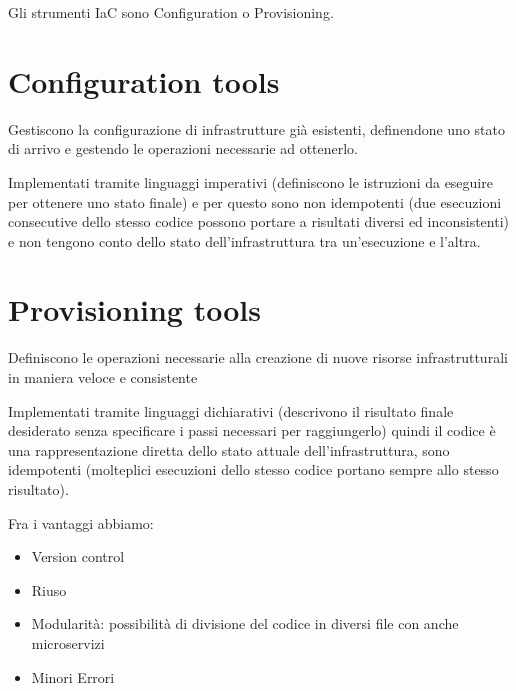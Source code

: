 \documentclass[
]{article}
\providecommand{\tightlist}{%
  \setlength{\itemsep}{0pt}\setlength{\parskip}{0pt}}
\begin{document}
{}

{Gli strumenti IaC sono Configuration o Provisioning.}

{}

\section{\texorpdfstring{{Configuration
tools}}{Configuration tools}}\label{h.kmluy5bzgox}

{Gestiscono la configurazione di infrastrutture già esistenti,
definendone uno stato di arrivo e gestendo le operazioni necessarie ad
ottenerlo.}

{}

{Implementati tramite linguaggi imperativi (definiscono le istruzioni da
eseguire per ottenere uno stato finale) e per questo sono non
idempotenti (due esecuzioni consecutive dello stesso codice possono
portare a risultati diversi ed inconsistenti) e non tengono conto dello
stato dell'infrastruttura tra un'esecuzione e l'altra.}

{}

\section{\texorpdfstring{{Provisioning
tools}}{Provisioning tools}}\label{h.sd2op287qe8c}

{Definiscono le operazioni necessarie alla creazione di nuove risorse
infrastrutturali in maniera veloce e consistente}

{}

{Implementati tramite linguaggi dichiarativi (descrivono il risultato
finale desiderato senza specificare i passi necessari per raggiungerlo)
quindi il codice è una rappresentazione diretta dello stato attuale
dell'infrastruttura, sono idempotenti (molteplici esecuzioni dello
stesso codice portano sempre allo stesso risultato).}

{}

{Fra i vantaggi abbiamo:}

\begin{itemize}
\tightlist
\item
  {Version control}
\item
  {Riuso}
\item
  {Modularità}{: possibilità di divisione del codice in diversi file con
  anche microservizi}
\item
  {Minori Errori}
\end{itemize}

{}
\end{document}
